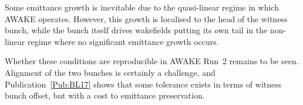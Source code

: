 Some emittance growth is inevitable due to the quasi-linear regime in which AWAKE operates.
However, this growth is localised to the head of the witness bunch, while the bunch itself drives wakefields putting its own tail in the non-linear regime where no significant emittance growth occurs.

Whether these conditions are reproducible in AWAKE Run~2 remains to be seen.
Alignment of the two bunches is certainly a challenge, and Publication~\ref{Pub:BL17} shows that some tolerance exists in terms of witness bunch offset, but with a cost to emittance preservation.
